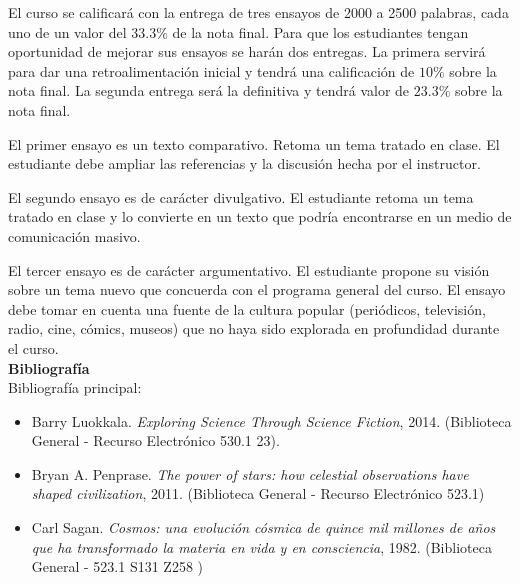 \documentclass[letterpaper,10pt,onecolumn]{article}
\begin{document}

\noindent\normalsize 
El curso se calificar\'a con la entrega de tres ensayos de 2000 a 2500
palabras, cada uno de un valor del $33.3\%$ de la nota final.  Para
que los estudiantes tengan oportunidad de mejorar sus ensayos se
har\'an dos entregas. La primera servir\'a para dar una
retroalimentaci\'on inicial y tendr\'a una calificaci\'on de $10\%$
sobre la nota final. La segunda entrega ser\'a la definitiva y
tendr\'a  valor de $23.3\%$ sobre la nota final.  
 
El primer ensayo es un texto comparativo. Retoma un tema 
tratado en clase. El estudiante debe ampliar las referencias y la
discusi\'on hecha por el instructor.

El segundo ensayo es de car\'acter divulgativo. El estudiante retoma
un tema tratado en clase y lo convierte en un texto que podr\'ia
encontrarse en un medio de comunicaci\'on masivo.   

El tercer ensayo es de car\'acter argumentativo. El estudiante propone
su visi\'on sobre un tema nuevo que concuerda con el programa general
del curso. El ensayo debe tomar en cuenta una fuente de la cultura
popular (peri\'odicos, televisi\'on, radio, cine, c\'omics, museos) que
no haya sido explorada en profundidad durante el curso.   
\\[0.1cm]

\noindent\textbf{\large {} \quad Bibliograf\'ia}\\[-0.2cm]



\noindent\normalsize Bibliograf\'ia principal:

\begin{itemize}
\item Barry Luokkala. \textit{Exploring Science Through Science
  Fiction}, 2014. (Biblioteca General - Recurso Electr\'onico 530.1 23).\\[-0.6cm]
\item Bryan A. Penprase. \textit{The power of stars: how celestial
  observations have shaped civilization}, 2011. (Biblioteca General -
  Recurso Electr\'onico 523.1) \\[-0.6cm]
\item Carl Sagan. \textit{Cosmos: una evoluci\'on c\'osmica de quince mil
  millones de a\~nos que ha transformado la materia en vida y en
  consciencia}, 1982. (Biblioteca General - 
  523.1 S131 Z258 )\\[-0.6cm]
\end{itemize}
\end{document}
